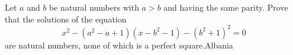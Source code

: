 Let $a$ and $b$ be natural numbers with $a > b$ and having the same parity. Prove that the solutions of the equation \[ x^2 - (a^2 - a + 1)(x - b^2 - 1) - (b^2 + 1)^2 = 0 \] are natural numbers, none of which is a perfect square.Albania